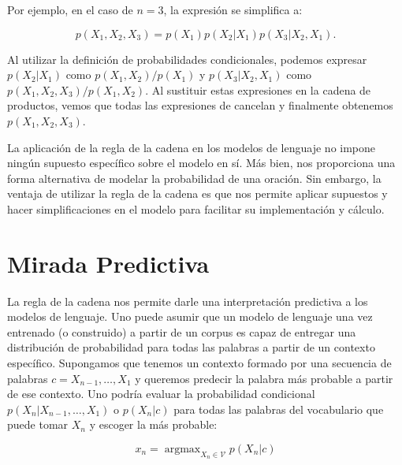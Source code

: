 Por ejemplo, en el caso de $n=3$, la expresión se simplifica a:

\begin{displaymath}
p(X_1,X_2,X_3)=p(X_1)p(X_2|X_1)p(X_3|X_2,X_1).
\end{displaymath}

Al utilizar la definición de probabilidades condicionales, podemos expresar $p(X_2|X_1)$ como $p(X_1,X_2)/p(X_1)$ y $p(X_3|X_2,X_1)$ como $p(X_1,X_2,X_3)/p(X_1,X_2)$. Al sustituir estas expresiones en la cadena de productos, vemos que todas las expresiones de cancelan y finalmente obtenemos $p(X_1,X_2,X_3)$.     

La aplicación de la regla de la cadena en los modelos de lenguaje no impone ningún supuesto específico sobre el modelo en sí. Más bien, nos proporciona una forma alternativa de modelar la probabilidad de una oración. Sin embargo, la ventaja de utilizar la regla de la cadena es que nos permite aplicar supuestos y hacer simplificaciones en el modelo para facilitar su implementación y cálculo.

\section{Mirada Predictiva}
La regla de la cadena nos permite darle una interpretación predictiva a los modelos de lenguaje. Uno puede asumir que un modelo de lenguaje una vez entrenado (o construido) a partir de un corpus es capaz de entregar una distribución de probabilidad para todas las palabras a partir de un contexto específico. Supongamos que tenemos un contexto formado por una secuencia de palabras $c=X_{n-1},\ldots,X_1$ y queremos predecir la palabra más probable a partir de ese contexto. Uno podría evaluar la probabilidad condicional $p(X_n|X_{n-1},\ldots,X_1)$ o $p(X_n|c)$ para todas las palabras del vocabulario que puede tomar $X_n$ y escoger la más probable:

\begin{displaymath}
x_n = \operatorname{argmax}_{X_n \in \mathcal{V}} p(X_n | c)
\end{displaymath}


